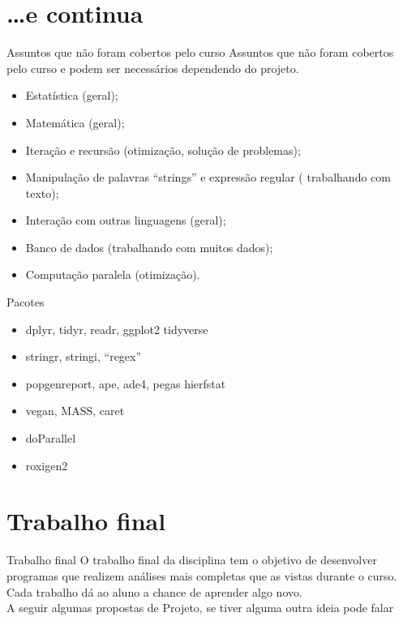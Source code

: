 \documentclass[handout]{beamer}
\begin{document}
  \section{\dots e continua}
\begin{frame}{Assuntos que não foram cobertos pelo curso}
 Assuntos que não foram cobertos pelo curso e podem ser necessários dependendo do projeto.   
\begin{itemize}[<+->]
  \item Estatística (geral);
  \item Matemática (geral);
  \item Iteração e recursão (otimização, solução de problemas);
  \item Manipulação de palavras ``strings'' e expressão regular ( trabalhando com texto);
  \item Interação com outras linguagens (geral);
  \item Banco de dados (trabalhando com muitos dados);
  \item Computação paralela (otimização).
  \end{itemize}
  
\end{frame}

\begin{frame}{Pacotes }
  \begin{itemize}
  \item dplyr, tidyr, readr, ggplot2 tidyverse
  \item stringr, stringi, ``regex''
  \item popgenreport, ape, ade4, pegas hierfstat
  \item vegan, MASS, caret    
  \item doParallel
    
  \item roxigen2
    \end{itemize}

  \end{frame}


  \section{Trabalho final}
\begin{frame}{Trabalho final}
  O trabalho final da disciplina tem o objetivo de desenvolver programas que realizem análises mais completas que as vistas durante o curso. Cada trabalho dá ao aluno a chance de aprender algo novo. \\


  
  A seguir algumas propostas de Projeto, se tiver alguma outra ideia pode falar 

\end{frame}
\end{document}
